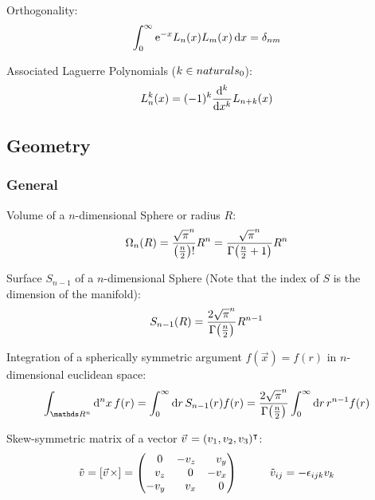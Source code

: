 			\noindent
			Orthogonality:
			\begin{equation}
				\int_0^\infty \mathrm{e}^{-x} L_n(x) L_m(x)\dd{x} = \delta_{nm}
			\end{equation}

			\noindent
			Associated Laguerre Polynomials ($k\in\\naturals _0$):
			\begin{equation}
				L_n^k(x) = (-1)^k\dv[k]{x} L_{n+k}(x)
			\end{equation}

	\subsection{Geometry}
		\subsubsection{General}
			\noindent
			Volume of a $n$-dimensional Sphere or radius $R$:
			\begin{equation}
				\Omega_n(R) = \frac{\sqrt{\pi}^n}{\qty(\frac{n}{2})!}R^n
				= \frac{\sqrt{\pi}^n}{\Gamma\qty(\frac{n}{2}+1)}R^n
			\end{equation}

			\noindent
			Surface $S_{n-1}$ of a $n$-dimensional Sphere (Note that the index of $S$ is the dimension of the manifold):
			\begin{equation}
				S_{n-1}(R) = \frac{2\sqrt{\pi}^n}{\Gamma\qty(\frac{n}{2})}R^{n-1}
			\end{equation}

			\noindent
			Integration of a spherically symmetric argument $f(\vec{x}) = f(r)$ in $n$-dimensional euclidean space:
			\begin{equation}
				\int_{\reals ^n} \dd[n]{x} f(r) 
				= \int_0^\infty \dd{r} S_{n-1}(r) f(r)
				= \frac{2\sqrt{\pi}^n}{\Gamma\qty(\frac{n}{2})} \int_0^\infty \dd{r} r^{n-1}  f(r)
			\end{equation}

			\noindent
			Skew-symmetric matrix of a vector $\vec{v} = (v_1, v_2, v_3)^\trp$:
			\begin{equation}
				\tilde{v} = \qty[\vec{v}\times] =
				\qty( \begin{matrix}
						\M 0   & -v_z   & \M v_y \\
						\M v_z & \M 0   & - v_x  \\
						-v_y   & \M v_x & \M 0   \\
					\end{matrix} ) \\
				\hsp
				\tilde{v}_{ij} = -\levicivita_{ijk}v_k
			\end{equation}


